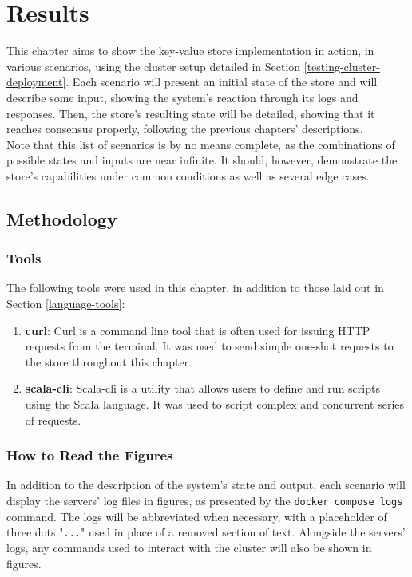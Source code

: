 \chapter{Results}

This chapter aims to show the key-value store implementation in action, in various scenarios, using the cluster setup detailed in Section \ref{testing-cluster-deployment}. Each scenario will present an initial state of the store and will describe some input, showing the system's reaction through its logs and responses. Then, the store's resulting state will be detailed, showing that it reaches consensus properly, following the previous chapters' descriptions.\\

Note that this list of scenarios is by no means complete, as the combinations of possible states and inputs are near infinite. It should, however, demonstrate the store's capabilities under common conditions as well as several edge cases.

\section{Methodology} \label{results-methodology-intro}

\subsection{Tools}

The following tools were used in this chapter, in addition to those laid out in Section \ref{language-tools}:
\begin{enumerate}
    \item \textbf{curl}: Curl is a command line tool that is often used for issuing HTTP requests from the terminal. It was used to send simple one-shot requests to the store throughout this chapter.
    \item \textbf{scala-cli}: Scala-cli is a utility that allows users to define and run scripts using the Scala language. It was used to script complex and concurrent series of requests.
\end{enumerate}

\subsection{How to Read the Figures}

In addition to the description of the system's state and output, each scenario will display the servers' log files in figures, as presented by the \lstinline|docker compose logs| command. The logs will be abbreviated when necessary, with a placeholder of three dots "\lstinline|...|" used in place of a removed section of text. Alongside the servers' logs, any commands used to interact with the cluster will also be shown in figures.\\

